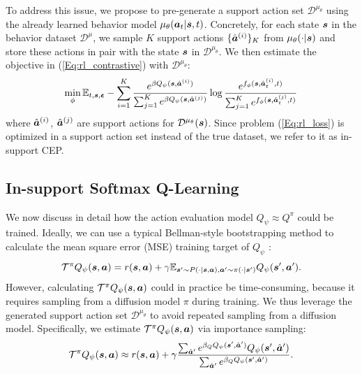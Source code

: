 To address this issue, we propose to pre-generate a support action set $\mathcal{D}^{\mu_\theta}$ using the already learned behavior model $\mu_\theta({\bm{a}}_t|{\bm{s}},t)$. Concretely, for each state ${\bm{s}}$ in the behavior dataset $\mathcal{D}^{\mu}$, we sample $K$ support actions $\{\hat {{\bm{a}}}^{(i)}\}_K$ from $\mu_\theta(\cdot|{\bm{s}})$ and store these actions in pair with the state ${\bm{s}}$ in $\mathcal{D}^{\mu_\theta}$. We then estimate the objective in (\ref{Eq:rl_contrastive}) with $\mathcal{D}^{\mu_\theta}$:
\begin{equation}
\label{Eq:rl_loss}
    \min_\phi \mathbb{E}_{t,{\bm{s}},\bm{\epsilon}} - \sum_{i=1}^K
    \frac{e^{\beta Q_\psi({\bm{s}}, \hat {{\bm{a}}}^{(i)})}}{\sum_{j=1}^K e^{\beta Q_\psi({\bm{s}}, \hat {{\bm{a}}}^{(j)})}}
    \log \frac{e^{f_\phi({\bm{s}}, \hat {{\bm{a}}}_t^{(i)}, t)}}{\sum_{j=1}^K e^{f_\phi({\bm{s}}, \hat {{\bm{a}}}_t^{(j)}, t)}}
\end{equation}
where $\hat {{\bm{a}}}^{(i)}$, $\hat {{\bm{a}}}^{(j)}$ are support actions for $\mathcal{D}^{\mu_\theta}({\bm{s}})$. Since problem (\ref{Eq:rl_loss}) is optimized in a support action set instead of the true dataset, we refer to it as in-support CEP.

\subsection{In-support Softmax Q-Learning}
\label{softmax_ql}
We now discuss in detail how the action evaluation model $Q_\psi \approx Q^{\pi}$ could be trained. Ideally, we can use a typical Bellman-style bootstrapping method to calculate the mean square error (MSE) training target of $Q_\psi$ \cite{dql, arq}:
\begin{equation}
    \label{Eq:one_step_bellman}
    \mathcal{T}^\pi Q_\psi({\bm{s}}, {\bm{a}}) = r({\bm{s}}, {\bm{a}}) + \gamma\mathbb{E}_{{\bm{s}}' \sim P(\cdot|{\bm{s}},{\bm{a}}), {\bm{a}}' \sim \pi(\cdot|{\bm{s}}')} Q_\psi({\bm{s}}', {\bm{a}}').
\end{equation}
However, calculating $\mathcal{T}^\pi Q_\psi({\bm{s}}, {\bm{a}})$ could in practice be time-consuming, because it requires sampling from a diffusion model $\pi$ during training. We thus leverage the generated support action set $\mathcal{D}^{\mu_\theta}$ to avoid repeated sampling from a diffusion model. Specifically, we estimate $\mathcal{T}^\pi Q_\psi({\bm{s}}, {\bm{a}})$ via importance sampling:
\begin{equation}
    \label{Eq:one_step_bellman_softmax}
    \mathcal{T}^\pi Q_\psi({\bm{s}}, {\bm{a}}) \approx r({\bm{s}}, {\bm{a}}) + \gamma \frac{\sum_{\hat{{\bm{a}}}'}e^{\beta_Q Q_\psi({\bm{s}}',\hat{{\bm{a}}}')}Q_\psi({\bm{s}}',\hat{{\bm{a}}}')}{\sum_{\hat{{\bm{a}}}'} e^{\beta_Q Q_\psi({\bm{s}}',\hat{{\bm{a}}}')}}.
\end{equation}





